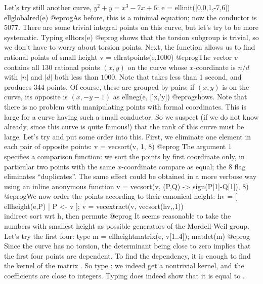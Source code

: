 Let's try still another curve, $y^2+y = x^3-7x+6$:
\bprog
  e = ellinit([0,0,1,-7,6])
  ellglobalred(e)
@eprog\noindent As before, this is a minimal equation; now the conductor is
5077. There are some trivial integral points on this curve, but let's try to
be more systematic. Typing
\bprog
  elltors(e)
@eprog\noindent
shows that the torsion subgroup is trivial, so we don't have to worry about
torsion points. Next, the function  allows us to find
rational points of small height
\bprog
  v = ellratpoints(e,1000)
@eprog\noindent The vector $v$ contains all 130 rational points $(x,y)$ on the
curve whose $x$-coordinate is $n/d$ with $|n|$ and $|d|$ both less than $1000$.
Note that  takes less than 1 second, and
produces 344 points. Of course, these are grouped by pairs:
if $(x,y)$ is on the curve, its opposite is $(x,-y-1)$ as
\bprog
  ellneg(e, ['x,'y])
@eprog\noindent shows. Note that there is no problem with manipulating points
with formal coordinates. This is large for a curve having such a small
conductor. So we suspect (if we do not know already, since this curve is
quite famous!) that the rank of this curve must be large. Let's try and put
some order into this. First, we eliminate one element in each pair
of opposite points:
\bprog
  v = vecsort(v, 1, 8)
@eprog\noindent
The argument $1$ specifies a comparison function: we sort the points by first
coordinate only, in particular two points with the same $x$-coordinate
compare as equal; the $8$ flag eliminates ``duplicates''. The same effect
could be obtained in a more verbose way using an inline anonymous function
\bprog
  v = vecsort(v, (P,Q) -> sign(P[1]-Q[1]), 8)
@eprog\noindent We now order the points according to their canonical height:
\bprog
  hv = [ ellheight(e,P) | P <- v ];
  v = vecextract(v, vecsort(hv,,1)) \\ indirect sort wrt h, then permute
@eprog\noindent
It seems reasonable to take the numbers with smallest height as
possible generators of the Mordell-Weil group. Let's try the first
four: type
\bprog
  m = ellheightmatrix(e, v[1..4]); matdet(m)
@eprog\noindent
Since the curve has no torsion, the determinant being close to zero
implies that the first four points are dependent. To find the
dependency, it is enough to find the kernel of the matrix . So
type : we indeed get a nontrivial kernel, and the
coefficients are close to integers. Typing  does
indeed show that it is equal to .

